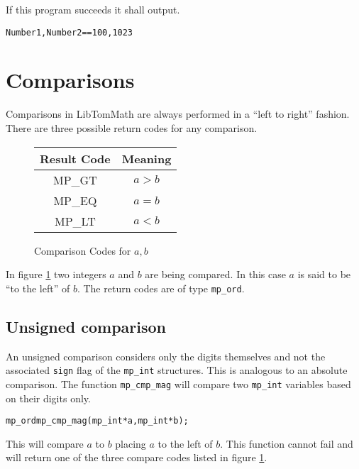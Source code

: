 \documentclass[synpaper]{book}
\begin{document}
If this program succeeds it shall output.
\begin{alltt}
Number1, Number2 == 100, 1023
\end{alltt}



\section{Comparisons}

Comparisons in LibTomMath are always performed in a ``left to right'' fashion.  There are three possible return codes
for any comparison.

  
\begin{figure}[h]
\begin{center}
\begin{tabular}{|c|c|}
\hline \textbf{Result Code} & \textbf{Meaning} \\
\hline MP\_GT & $a > b$ \\
\hline MP\_EQ & $a = b$ \\
\hline MP\_LT & $a < b$ \\
\hline
\end{tabular}
\end{center}
\caption{Comparison Codes for $a, b$}
\label{fig:CMP}
\end{figure}

In figure \ref{fig:CMP} two integers $a$ and $b$ are being compared.  In this case $a$ is said to be ``to the left'' of
$b$. The return codes are of type \texttt{mp\_ord}.

\subsection{Unsigned comparison}

An unsigned comparison considers only the digits themselves and not the associated \texttt{sign} flag of the
\texttt{mp\_int} structures.  This is analogous to an absolute comparison.  The function \texttt{mp\_cmp\_mag} will compare two
\texttt{mp\_int} variables based on their digits only.

\begin{alltt}
mp_ord mp_cmp_mag(mp_int *a, mp_int *b);
\end{alltt}
This will compare $a$ to $b$ placing $a$ to the left of $b$.  This function cannot fail and will return one of the
three compare codes listed in figure \ref{fig:CMP}.
\end{document}
